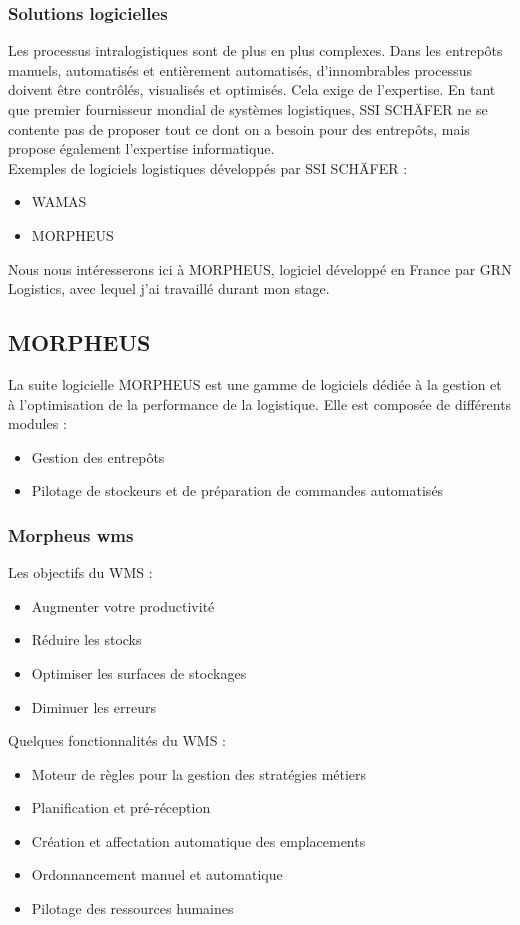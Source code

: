 \documentclass[a4paper, 12pt, french]{article}
\newcommand{\bdot}{\item[\color{ssiYellow}\ding{108}]}
\begin{document}
			\subsubsection{Solutions logicielles}
				Les processus intralogistiques sont de plus en plus complexes. Dans les entrepôts manuels, automatisés et entièrement automatisés, d'innombrables processus doivent être contrôlés, visualisés et optimisés. Cela exige de l'expertise. En tant que premier fournisseur mondial de systèmes logistiques, SSI SCHÄFER ne se contente pas de proposer tout ce dont on a besoin pour des entrepôts, mais propose également l'expertise informatique.\\

				\noindent
				Exemples de logiciels logistiques développés par SSI SCHÄFER :
				\begin{itemize}
					\bdot{WAMAS}
					\bdot{MORPHEUS}
				\end{itemize}
				\vspace{\baselineskip}
				\par Nous nous intéresserons ici à MORPHEUS, logiciel développé en France par GRN Logistics, avec lequel j'ai travaillé durant mon stage.

		\subsection{MORPHEUS}
				La suite logicielle MORPHEUS est une gamme de logiciels dédiée à la gestion et à l'optimisation de la performance de la logistique. Elle est composée de différents modules :
			\begin{itemize}
				\bdot{Gestion des entrepôts}
				\bdot{Pilotage de stockeurs et de préparation de commandes automatisés}
			\end{itemize}

			\subsubsection{Morpheus \acrshort{wms}}
				\noindent				
				Les objectifs du WMS :%
				\begin{itemize}
					\bdot{Augmenter votre productivité}
					\bdot{Réduire les stocks}
					\bdot{Optimiser les surfaces de stockages}
					\bdot{Diminuer les erreurs}
				\end{itemize}
				\vspace{\baselineskip}
				Quelques fonctionnalités du WMS :
				\begin{itemize}
					\bdot{Moteur de règles pour la gestion des stratégies métiers}
					\bdot{Planification et pré-réception}
					\bdot{Création et affectation automatique des emplacements}
					\bdot{Ordonnancement manuel et automatique}
					\bdot{Pilotage des ressources humaines}
				\end{itemize}
			
\end{document}
